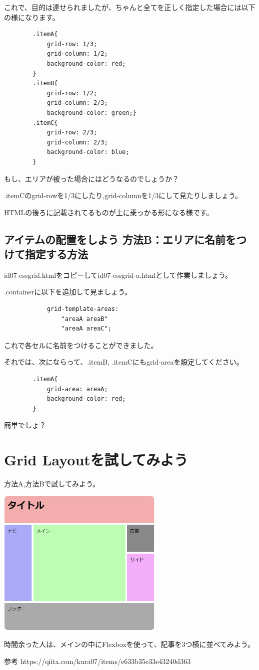 \documentclass[mingoth,11pt,a4j,uplatex,dvipdfmx]{jsarticle}
\begin{document}
これで、目的は達せられましたが、ちゃんと全てを正しく指定した場合には以下の様になります。

\begin{lstlisting}
        .itemA{
            grid-row: 1/3;
            grid-column: 1/2;
            background-color: red;
        }
        .itemB{
            grid-row: 1/2;
            grid-column: 2/3;
            background-color: green;}
        .itemC{
            grid-row: 2/3;
            grid-column: 2/3;
            background-color: blue;
        }
\end{lstlisting}

もし、エリアが被った場合にはどうなるのでしょうか？

.itemCのgrid-rowを1/3にしたり,grid-columnを1/3にして見たりしましょう。

HTMLの後ろに記載されてるものが上に乗っかる形になる様です。

\subsection{アイテムの配置をしよう 方法B：エリアに名前をつけて指定する方法}
id07-cssgrid.htmlをコピーしてid07-cssgrid-a.htmlとして作業しましょう。

.containerに以下を追加して見ましょう。
\begin{lstlisting}
            grid-template-areas: 
                "areaA areaB"
                "areaA areaC";
\end{lstlisting}
これで各セルに名前をつけることができました。

それでは、次にならって、.itemB, .itemCにもgrid-areaを設定してください。
\begin{lstlisting}
        .itemA{
            grid-area: areaA;
            background-color: red;
        }
\end{lstlisting}

簡単でしょ？

\section{Grid Layoutを試してみよう}
方法A,方法Bで試してみよう。

\includegraphics[width=8cm]{img/3column.png}

時間余った人は、メインの中にFlexboxを使って、記事を3つ横に並べてみよう。

参考
https://qiita.com/kura07/items/e633b35e33e43240d363











\end{document}
